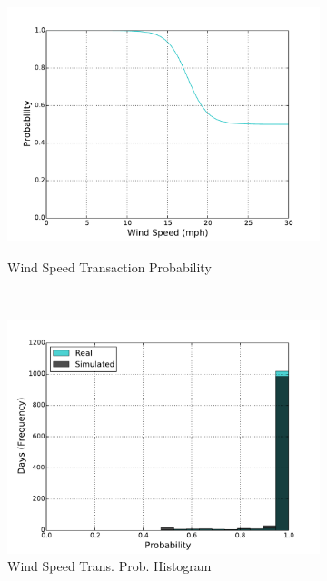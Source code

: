 \documentclass[11pt, letterpaper]{article}
\begin{document}
\begin{figure}[H]
  \centering
  \begin{subfigure}[b]{0.45\textwidth}
    \includegraphics[width=\textwidth]{figures/wind_speed_trans_prob.pdf}
    \label{fig:analysis-raw}
    \caption{Wind Speed Transaction Probability}
  \end{subfigure}
  ~
  \begin{subfigure}[b]{0.45\textwidth}
    \includegraphics[width=\textwidth]{figures/wind_speed_trans_prob_hist.pdf}
    \caption{Wind Speed Trans. Prob. Histogram}
  \end{subfigure}
  ~
  \begin{subfigure}[b]{0.45\textwidth}

\end{subfigure}
\end{figure}
\end{document}
